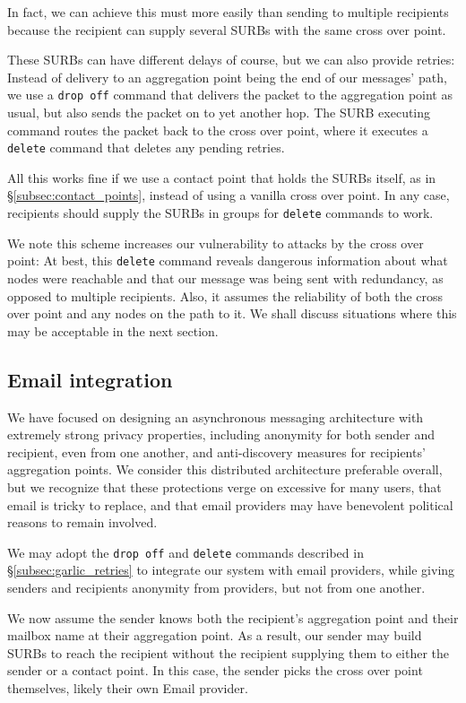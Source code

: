 In fact, we can achieve this must more easily than sending to
multiple recipients because the recipient can supply several SURBs
with the same cross over point.

These SURBs can have different delays of course, but we can also
provide retries:  Instead of delivery to an aggregation point being
the end of our messages' path, we use a {\tt drop off} command that
delivers the packet to the aggregation point as usual, but also
sends the packet on to yet another hop.  The SURB executing command
routes the packet back to the cross over point, where it executes a
{\tt delete} command that deletes any pending retries.

All this works fine if we use a contact point that holds the SURBs
itself, as in \S\ref{subsec:contact_points}, instead of using a
vanilla cross over point.  In any case, recipients should supply the
SURBs in groups for {\tt delete} commands to work.

We note this scheme increases our vulnerability to attacks by the
cross over point:  At best, this {\tt delete} command reveals
dangerous information about what nodes were reachable and that our
message was being sent with redundancy, as opposed to multiple 
recipients.  Also, it assumes the reliability of both the cross over
point and any nodes on the path to it.
%
We shall discuss situations where this may be acceptable in the next section.


\subsection{Email integration}\label{subsec:LEAP}

We have focused on designing an asynchronous messaging architecture
with extremely strong privacy properties, including anonymity for both
sender and recipient, even from one another, and anti-discovery
measures for recipients' aggregation points.  
%
We consider this distributed architecture preferable overall, but
we recognize that these protections verge on excessive for many users,
that email is tricky to replace, and that email providers may have
benevolent political reasons to remain involved.

We may adopt the {\tt drop off} and {\tt delete} commands described
in \S\ref{subsec:garlic_retries} to integrate our system with email
providers, while giving senders and recipients anonymity from
providers, but not from one another.

We now assume the sender knows both the recipient's aggregation point
and their mailbox name at their aggregation point.  As a result, our
sender may build SURBs to reach the recipient without the recipient
supplying them to either the sender or a contact point.  
In this case, the sender picks the cross over point themselves, 
likely their own Email provider.

